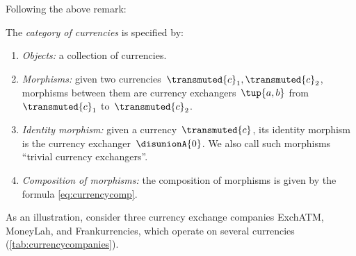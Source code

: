 Following the above remark:

\begin{definition}
    \label{def:Curr}
    The \emph{category of currencies} \Curr is specified by:
    \begin{enumerate}
        \item \emph{Objects:} a collection of currencies.
        \item \emph{Morphisms:} given two currencies~$\transmuted{c}_1, \transmuted{c}_2$, morphisms between them are currency exchangers~$\tup{a,b}$ from~$\transmuted{c}_1$ to~$\transmuted{c}_2$.
        \item \emph{Identity morphism:} given a currency~$\transmuted{c}$, its identity morphism is the currency exchanger~$\disunionA{0}$. We also call such morphisms ``trivial currency exchangers''.
        \item \emph{Composition of morphisms:} the composition of morphisms is given by the formula \cref{eq:currencycomp}.
    \end{enumerate}
\end{definition}

As an illustration, consider three currency exchange companies ExchATM, MoneyLah, and Frankurrencies, which operate on several currencies (\cref{tab:currencycompanies}).


